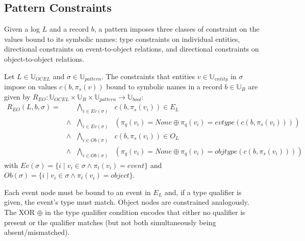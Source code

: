 \subsection{Pattern Constraints}

Given a log $L$ and a record $b$, a pattern imposes three classes of constraint on the values bound to its symbolic names: type constraints on individual entities, directional constraints on event-to-object relations, and directional constraints on object-to-object relations.

\begin{frameddef}
Let $L \in \mathbb{U}_{OCEL}$ and $\sigma \in \mathbb{U}_{pattern}$. The constraints that entities $v \in \mathbb{U}_{entity}$ in $\sigma$ impose on values $c(b, \pi_s(v))$ bound to symbolic names in a record $b \in \mathbb{U}_B$ are given by $R_{EO} : \mathbb{U}_{OCEL} \times \mathbb{U}_B \times \mathbb{U}_{pattern} \to \mathbb{U}_{bool}$:
\[
\begin{array}{rcrl}
R_{EO}(L, b, \sigma) = & & \displaystyle \bigwedge_{i \in Ev(\sigma)} & c(b, \pi_s(v_i)) \in E_L \\
& \land & \displaystyle \bigwedge_{i \in Ev(\sigma)} & (\pi_q(v_i) = None \oplus \pi_q(v_i) = evtype(c(b, \pi_s(v_i)))) \\
& \land & \displaystyle \bigwedge_{i \in Ob(\sigma)} & c(b, \pi_s(v_i)) \in O_L \\
& \land & \displaystyle \bigwedge_{i \in Ob(\sigma)} & (\pi_q(v_i) = None \oplus \pi_q(v_i) = objtype(c(b, \pi_s(v_i))))
\end{array}
\]
with $Ev(\sigma) = \{ i \mid v_i \in \sigma \land \pi_t(v_i) = event \}$ and $Ob(\sigma) = \{ i \mid v_i \in \sigma \land \pi_t(v_i) = object \}$.
\end{frameddef}

Each event node must be bound to an event in $E_L$ and, if a type qualifier is given, the event's type must match. Object nodes are constrained analogously. The XOR $\oplus$ in the type qualifier condition encodes that either no qualifier is present or the qualifier matches (but not both simultaneously being absent/mismatched).

